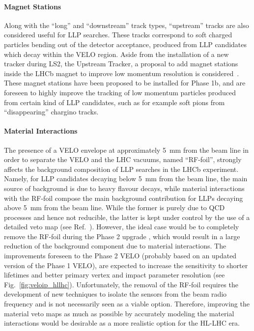 \paragraph{Magnet Stations}

Along with the ``long'' and ``downstream'' track types, ``upstream'' tracks are also considered useful for LLP searches. These tracks correspond to soft charged particles bending out of the detector acceptance, produced from LLP candidates which decay within the VELO region. Aside from the installation of a new tracker during LS2, the Upstream Tracker, a proposal to add magnet stations inside the LHCb magnet to improve low momentum resolution is considered~\cite{Aaij:2244311}. These magnet stations have been proposed to be installed for Phase 1b, and are foreseen to highly improve the tracking of low momentum particles produced from certain kind of LLP candidates, such as for example soft pions from ``disappearing'' chargino tracks.

\paragraph{Material Interactions}

The presence of a VELO envelope at approximately 5~mm from the beam line in order to separate the VELO and the LHC vacuums, named ``RF-foil'', strongly affects the background composition of LLP searches in the LHCb experiment. Namely, for LLP candidates decaying below 5~mm from the beam line, the main source of background is due to heavy flavour decays, while material interactions with the RF-foil compose the main background contribution for LLPs decaying above 5~mm from the beam line. While the
former is purely due to QCD processes and hence not reducible, the latter is kept under control by the use of a detailed veto map (see Ref.~\cite{Aaij:2017rft}). However, the ideal case would be to completely remove the RF-foil during the Phase 2 upgrade \cite{Aaij:2244311}, which would result in a large reduction of the background component due to material interactions. The improvements foreseen to the Phase 2 VELO (probably based on an updated
version of the Phase 1  VELO), are expected to increase the sensitivity to shorter lifetimes and better primary vertex and impact parameter resolution (see Fig.~\ref{fig:veloip_hllhc}). Unfortunately, the removal of the RF-foil requires the development of new techniques to isolate the sensors from the beam radio frequency and is not necessarily seen as a viable option. Therefore, improving the material veto maps as much as possible by accurately modeling the material interactions would be desirable as a more realistic option for the HL-LHC era.

